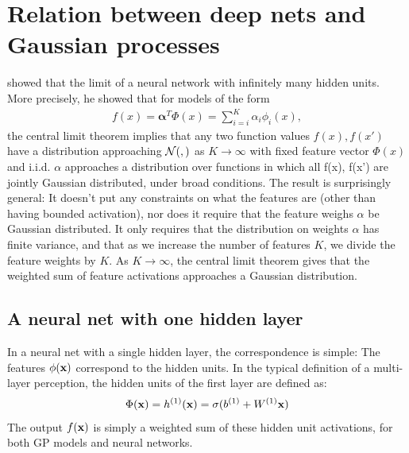 \documentclass{article}
\begin{document}
\section{Relation between deep nets and Gaussian processes}







\cite{neal1995bayesian} showed that the limit of a neural network with infinitely many hidden units. More precisely, he showed that for models of the form
%
\begin{align}
f(x) = {\mathbf \alpha}^T \Phi(x) = \sum_{i=i}^K \alpha_i \phi_i(x),
\end{align}
%
the central limit theorem implies that any two function values $f(x), f(x')$ have a distribution approaching $\mathcal{N}\!\left(,\right)$ as $K \rightarrow \infty$ with fixed feature vector $\Phi(x)$ and i.i.d. $\alpha$ approaches a distribution over functions in which all f(x), f(x') are jointly Gaussian distributed, under broad conditions. The result is surprisingly general:  It doesn't put any constraints on what the features are (other than having bounded activation), nor does it require that the feature weighs $\alpha$ be Gaussian distributed.  It only requires that the distribution on weights $\alpha$ has finite variance, and that as we increase the number of features $K$, we divide the feature weights by $K$.  As $K \rightarrow \infty$, the central limit theorem gives that the weighted sum of feature activations approaches a Gaussian distribution.

\subsection{A neural net with one hidden layer}

In a neural net with a single hidden layer, the correspondence is simple:  The features $\phi({\bf{x}})$ correspond to the hidden units.  In the typical definition of a multi-layer perception, the hidden units of the first layer are defined as:
%
\begin{align}
\Phi({\bf{x}}) = h^{(1)}({\bf{x}}) = \sigma( b^{(1)} + W^{(1)}{\bf{x}} )
\end{align}
%
The output $f({\bf{x}})$ is simply a weighted sum of these hidden unit activations, for both GP models and neural networks.
\end{document}
